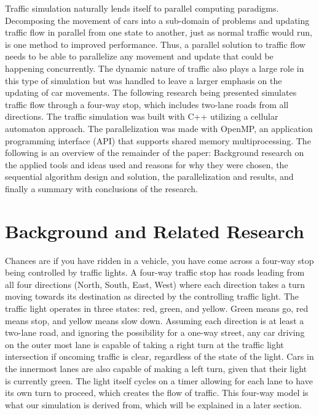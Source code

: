 \documentclass[conference]{IEEEtran}
\begin{document}
Traffic simulation naturally lends itself to parallel computing paradigms. Decomposing the movement of cars into a sub-domain of problems and updating traffic flow in parallel from one state to another, just as normal traffic would run, is one method to improved performance. 
Thus, a parallel solution to traffic flow needs to be able to parallelize any movement and update that could be happening concurrently. The dynamic nature of traffic also plays a large role in this type of simulation but was handled to leave a larger emphasis on the updating of car movements. The following research being presented simulates traffic flow through a four-way stop, which includes two-lane roads from all directions. The traffic simulation was built with C++ utilizing a cellular automaton approach.  The parallelization was made with OpenMP, an application programming interface (API) that supports shared memory multiprocessing. The following is an overview of the remainder of the paper: Background research on the applied tools and ideas used and reasons for why they were chosen, the sequential algorithm design and solution, the parallelization and results, and finally a summary with conclusions of the research. \\


\section{Background and Related Research}
Chances are if you have ridden in a vehicle, you have come across a four-way stop being controlled by traffic lights. A four-way traffic stop has roads leading from all four directions (North, South, East, West) where each direction takes a turn moving towards its destination as directed by the controlling traffic light. The traffic light operates in three states: red, green, and yellow. Green means go, red means stop, and yellow means slow down. Assuming each direction is at least a two-lane road, and ignoring the possibility for a one-way street, any car driving on the outer most lane is capable of taking a right turn at the traffic light intersection if oncoming traffic is clear, regardless of the state of the light. Cars in the innermost lanes are also capable of making a left turn, given that their light is currently green. The light itself cycles on a timer allowing for each lane to have its own turn to proceed, which creates the flow of traffic. This four-way model is what our simulation is derived from, which will be explained in a later section. \\
\end{document}
